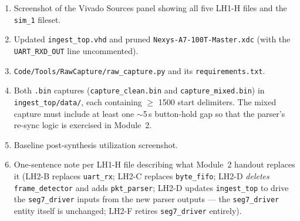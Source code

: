 \documentclass[11pt,letterpaper]{article}
\begin{document}
\begin{tcolorbox}[deliverable={Lab Handout 2-A Deliverable}]
	\begin{enumerate}[leftmargin=1.2em]
		\item Screenshot of the Vivado Sources panel showing all five LH1-H files and the \texttt{sim\_1} fileset.
		\item Updated \texttt{ingest\_top.vhd} and pruned \texttt{Nexys-A7-100T-Master.xdc} (with the \texttt{UART\_RXD\_OUT} line uncommented).
		\item \texttt{Code/Tools/RawCapture/raw\_capture.py} and its \texttt{requirements.txt}.
		\item Both \texttt{.bin} captures (\texttt{capture\_clean.bin} and \texttt{capture\_mixed.bin}) in \texttt{ingest\_top/data/}, each containing $\geq$ 1500 start delimiters. The mixed capture must include at least one $\sim$5\,s button-hold gap so that the parser's re-sync logic is exercised in Module~2.
		\item Baseline post-synthesis utilization screenshot.
		\item One-sentence note per LH1-H file describing what Module~2 handout replaces it (LH2-B replaces \texttt{uart\_rx}; LH2-C replaces \texttt{byte\_fifo}; LH2-D \emph{deletes} \texttt{frame\_detector} and adds \texttt{pkt\_parser}; LH2-D updates \texttt{ingest\_top} to drive the \texttt{seg7\_driver} inputs from the new parser outputs --- the \texttt{seg7\_driver} entity itself is unchanged; LH2-F retires \texttt{seg7\_driver} entirely).
	\end{enumerate}
\end{tcolorbox}

\printhandoutglossary
\end{document}
